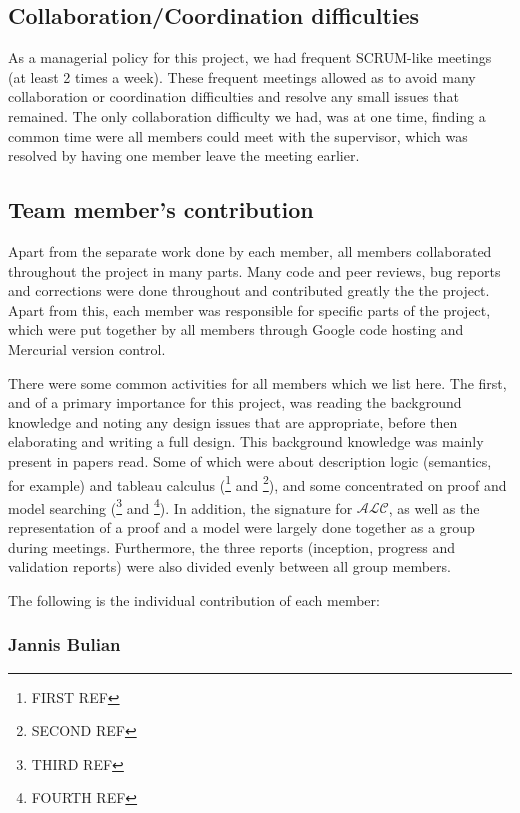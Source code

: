 \subsection{Collaboration/Coordination difficulties}

As a managerial policy for this project, we had frequent SCRUM-like meetings (at least 2 times a week). These frequent meetings allowed as to avoid many collaboration or coordination difficulties and resolve any small issues that remained. The only collaboration difficulty we had, was at one time, finding a common time were all members could meet with the supervisor, which was resolved by having one member leave the meeting earlier.

\subsection{Team member's contribution}

Apart from the separate work done by each member, all members collaborated throughout the project in many parts. Many code and peer reviews, bug reports and corrections were done
throughout and contributed greatly the the project. Apart from this, each member was responsible for specific parts of the project, which were put together by all members through Google code hosting and Mercurial version control. 

There were some common activities for all members which we list here. The first, and of a primary importance for this project, was reading the background knowledge and noting any design issues that are appropriate, before then elaborating and writing a full design. This background knowledge was mainly present in papers read. Some of which were about description logic (semantics, for example) and tableau calculus (\footnote{FIRST REF} and \footnote{SECOND REF}), and some concentrated on proof and model searching (\footnote{THIRD REF} and \footnote{FOURTH REF}). In addition, the signature for $\mathcal{ALC}$, as well as the representation of a proof and a model were largely done together as a group during meetings. Furthermore, the three reports (inception, progress and validation reports) were also divided evenly between all group members.

The following is the individual contribution of each member:

\subsubsection*{Jannis Bulian}

